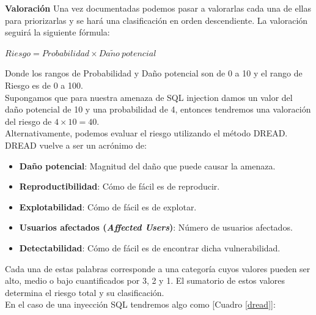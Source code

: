 \documentclass[a4paper,oneside]{article}
\begin{document}
\begin{table}[ht]
\centering
{}
\caption{Documentación de amenazas} 
\label{docu}
\end{table} 

\textbf{Valoración}
Una vez documentadas podemos pasar a valorarlas cada una de ellas para priorizarlas y se hará una clasificación en orden descendiente. La valoración seguirá la siguiente fórmula:
\begin{center}
$Riesgo = Probabilidad \times Da\tilde{n}o\:potencial$
\end{center}
Donde los rangos de Probabilidad y Daño potencial son de 0 a 10 y el rango de Riesgo es de 0 a 100.\\
Supongamos que para nuestra amenaza de SQL injection damos un valor del daño potencial de 10 y una probabilidad de 4, entonces tendremos una valoración del riesgo de $ 4 \times 10 = 40 $.\\

Alternativamente, podemos evaluar el riesgo utilizando el método DREAD. DREAD vuelve a ser un acrónimo de:
\begin{itemize}
\item \textbf{Daño potencial}: Magnitud del daño que puede causar la amenaza.
\item \textbf{Reproductibilidad}: Cómo de fácil es de reproducir.
\item \textbf{Explotabilidad}: Cómo de fácil es de explotar.
\item \textbf{Usuarios afectados (\textit{Affected Users})}: Número de usuarios afectados.
\item \textbf{Detectabilidad}: Cómo de fácil es de encontrar dicha vulnerabilidad.
\end{itemize}

Cada una de estas palabras corresponde a una categoría cuyos valores pueden ser alto, medio o bajo cuantificados por 3, 2 y 1. El sumatorio de estos valores determina el riesgo total y su clasificación.\\
En el caso de una inyección SQL tendremos algo como [Cuadro \ref{dread}]:
\end{document}
